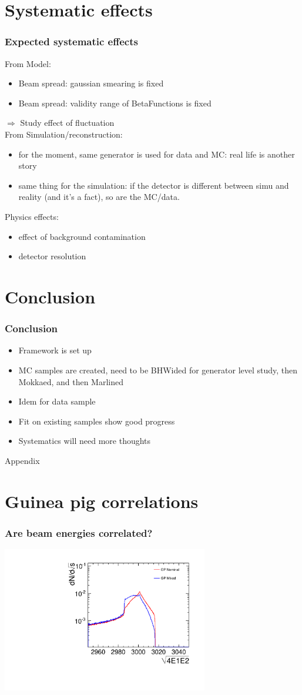 \documentclass[handout]{beamer}
\begin{document}
\section{Systematic effects}
\begin{frame}
\frametitle{Expected systematic effects}
From Model:
\begin{itemize}
  \item Beam spread: gaussian smearing is fixed
  \item Beam spread: validity range of BetaFunctions is fixed
\end{itemize}
  $\Rightarrow$ Study effect of fluctuation\\
\pause
From Simulation/reconstruction:
\begin{itemize}
  \item for the moment, same generator is used for data and MC: real life is
  another story
  \item same thing for the simulation: if the detector is different between
  simu and reality (and it's a fact), so are the MC/data. 
\end{itemize}
\pause
Physics effects:
\begin{itemize}
  \item effect of background contamination 
  \item detector resolution 
\end{itemize}
\end{frame}
\section{Conclusion}
\begin{frame}
\frametitle{Conclusion}
\begin{itemize}
  \item Framework is set up
  \item MC samples are created, need to be BHWided for generator level study,
  then Mokkaed, and then Marlined
  \item Idem for data sample
  \item Fit on existing samples show good progress
  \item Systematics will need more thoughts
\end{itemize}

\end{frame}
\appendix
\begin{frame}
\begin{center}
{\color{blue} Appendix}
\end{center}
\end{frame}
\section{Guinea pig correlations}
\begin{frame}
\frametitle{Are beam energies correlated?}
\includegraphics[width=9cm]{GPnominal_vs_GPmixed}
\end{frame}
\end{document}
